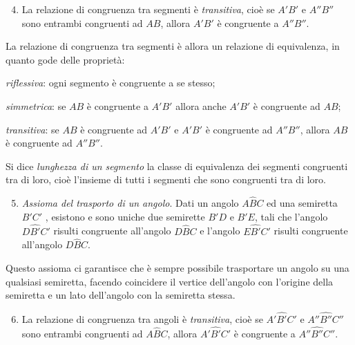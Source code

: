 \begin{enumerate}[label=\Roman{*}.]
\setcounter{enumi}{3}
\item La relazione di congruenza tra segmenti è \emph{transitiva}, 
cioè se \(A'B'\) e \(A''B''\) sono entrambi congruenti ad \(AB\), allora 
\(A'B'\) è congruente a \(A''B''\).
\end{enumerate}
La relazione di congruenza tra segmenti è allora un relazione di 
equivalenza, in quanto gode delle proprietà:
\begin{enumeratea}
\item \emph{riflessiva}: ogni segmento è congruente a se stesso;
\item \emph{simmetrica}: se \(AB\) è congruente a \(A'B'\) allora anche 
\(A'B'\) è congruente ad \(AB\);
\item \emph{transitiva}: se \(AB\) è congruente ad \(A'B'\) e \(A'B'\) è 
congruente ad \(A''B''\), allora \(AB\) è congruente ad \(A''B''\).
\end{enumeratea}

\begin{definizione}
Si dice \emph{lunghezza di un segmento} la classe di equivalenza dei 
segmenti congruenti tra di loro, cioè l'insieme di tutti i segmenti 
che sono congruenti tra di loro.
\end{definizione}

\begin{enumerate}[label=\Roman{*}.]
\setcounter{enumi}{4}
\item \emph{Assioma del trasporto di un angolo}. Dati un angolo 
\(A\widehat{B}C\) ed una semiretta \(B'C'\) , esistono e sono uniche due 
semirette \(B'D\) e \(B'E\), tali che l'angolo \(D\widehat{B'}C'\) risulti 
congruente all'angolo \(D\widehat{B}C\) e l'angolo \(E\widehat{B'}C'\) 
risulti congruente all'angolo \(D\widehat{B}C\).
\end{enumerate}
Questo assioma ci garantisce che è sempre possibile trasportare un 
angolo su una qualsiasi semiretta, facendo coincidere il vertice 
dell'angolo con l'origine della semiretta e un lato dell'angolo con 
la semiretta stessa.

\begin{enumerate}[label=\Roman{*}.]
\setcounter{enumi}{5}
\item La relazione di congruenza tra angoli è \emph{transitiva}, cioè 
se \(A'\widehat{B'}C'\) e \(A''\widehat{B''}C''\) sono entrambi 
congruenti ad \(A\widehat{B}C\), allora \(A'\widehat{B'}C'\) è congruente 
a \(A''\widehat{B''}C''\).
\end{enumerate}

